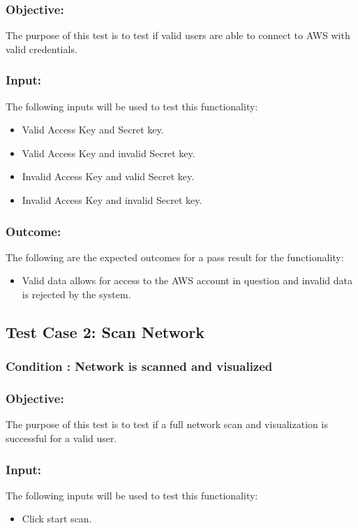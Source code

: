 \documentclass[hidelinks,a4paper,12pt]{article}
\begin{document}
\subsubsection{Objective:} The purpose of this test is to test if valid users are able to connect to AWS with valid credentials.

\subsubsection{Input:}
 The following inputs will be used to test this functionality:
\begin{itemize}
  \item Valid Access Key and Secret key.
  \item Valid Access Key and invalid Secret key.
 \item Invalid Access Key and valid Secret key.
 \item Invalid Access Key and invalid Secret key.
\end{itemize}
\subsubsection{Outcome: }
The following are the expected outcomes for a pass result for the functionality:
\begin{itemize}
	\item Valid data allows for access to the AWS account in question and invalid data is rejected by the system. 
\end{itemize}

\subsection{Test Case 2: Scan Network }
\subsubsection{Condition : Network is scanned and visualized}
\subsubsection{Objective:} The purpose of this test is to test if a full network scan and visualization is successful for a valid user.

\subsubsection{Input:}
 The following inputs will be used to test this functionality:
\begin{itemize}
  \item Click start scan.
\end{itemize}
\end{document}
